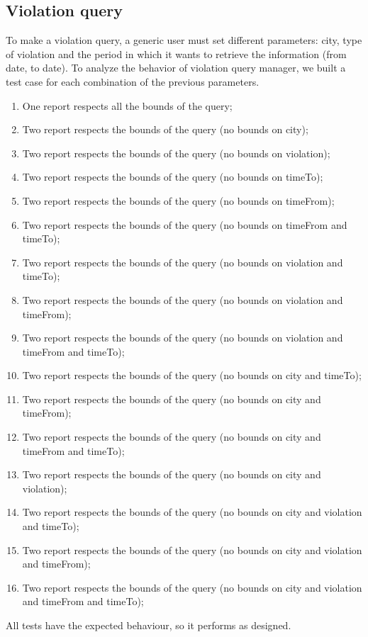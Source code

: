 \documentclass[../ITD.tex]{subfiles}
\begin{document}
    \subsection{Violation query}\label{subsec:violation-query}
    To make a violation query, a generic user must set different parameters: city, type of violation and the period in which it wants to retrieve the information (from date, to date).
    To analyze the behavior of violation query manager, we built a test case for each combination of the previous parameters.
    \begin{enumerate}
        \item One report respects all the bounds of the query;
        \item Two report respects the bounds of the query (no bounds on city);
        \item Two report respects the bounds of the query (no bounds on violation);
        \item Two report respects the bounds of the query (no bounds on timeTo);
        \item Two report respects the bounds of the query (no bounds on timeFrom);
        \item Two report respects the bounds of the query (no bounds on timeFrom and timeTo);
        \item Two report respects the bounds of the query (no bounds on violation and timeTo);
        \item Two report respects the bounds of the query (no bounds on violation and timeFrom);
        \item Two report respects the bounds of the query (no bounds on violation and timeFrom and timeTo);
        \item Two report respects the bounds of the query (no bounds on city and timeTo);
        \item Two report respects the bounds of the query (no bounds on city and timeFrom);
        \item Two report respects the bounds of the query (no bounds on city and timeFrom and timeTo);
        \item Two report respects the bounds of the query (no bounds on city and violation);
        \item Two report respects the bounds of the query (no bounds on city and violation and timeTo);
        \item Two report respects the bounds of the query (no bounds on city and violation and timeFrom);
        \item Two report respects the bounds of the query (no bounds on city and violation and timeFrom and timeTo);
    \end{enumerate}
    All tests have the expected behaviour, so it performs as designed.
\end{document}
